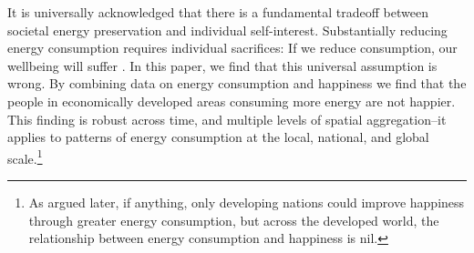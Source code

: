 \documentclass[10pt, letterpaper]{article}
\begin{document}
\begin{spacing}{1.5}
It is universally acknowledged that there is a fundamental tradeoff between
societal energy preservation and individual self-interest. Substantially reducing
energy consumption requires individual sacrifices: If we reduce consumption, our
wellbeing will 
suffer \citep{gordon_wsj_may_29_14, dietz15, jorgenson14B, carter_pbs_apr_18_77,smil05}. %
%
%
%
%
%
In this paper, we find that this universal assumption is wrong.  By combining
data on energy consumption and happiness we find that the
 people in economically developed areas consuming more energy are not happier.
This finding is robust across time, and multiple levels of spatial
aggregation--it applies to patterns of energy consumption  at the local,
national, and global scale.\footnote{As argued later, if anything, only
  developing nations could improve happiness through greater energy consumption,
  but across the developed world, the relationship between energy consumption and happiness is nil.}  



\end{spacing}
\end{document}
